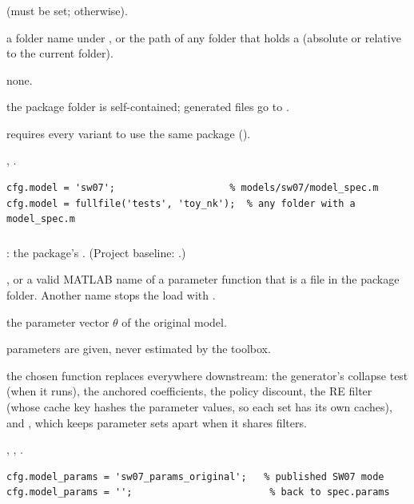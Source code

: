 \documentclass[11pt,a4paper]{article}
\DeclareRobustCommand{\codem}[1]{\texttt{\detokenize{#1}}}
\newenvironment{optspec}%
  {\begin{description}[style=sameline,leftmargin=2.7cm,labelwidth=2.5cm,font=\normalfont\itshape]}%
  {\end{description}}
\begin{document}
\subsubsection{\texorpdfstring{\codem{model}}{model}}\label{opt:model}
\begin{optspec}
  \item[Default]  (must be set;  otherwise).
  \item[Values] a folder name under , or the path of any folder that holds a
         (absolute or relative to the current folder).
  \item[Math] none.
  \item[Assumptions] the package folder is self-contained; generated files go to
        .
  \item[Interactions]  requires every variant to use the same package
        ().
  \item[Code] , .
  \item[Example]
\begin{lstlisting}
cfg.model = 'sw07';                    % models/sw07/model_spec.m
cfg.model = fullfile('tests', 'toy_nk');  % any folder with a model_spec.m
\end{lstlisting}
\end{optspec}

\subsubsection{\texorpdfstring{\codem{model_params}}{model\_params}}\label{opt:model-params}
\begin{optspec}
  \item[Default] : the package's . (Project baseline:
        .)
  \item[Values] , or a valid MATLAB name of a parameter function that is a
         file in the package folder. Another name stops the load with
        .
  \item[Math] the parameter vector $\theta$ of the original model.
  \item[Assumptions] parameters are given, never estimated by the toolbox.
  \item[Interactions] the chosen function replaces  everywhere downstream:
        the generator's collapse test (when it runs), the anchored coefficients, the policy
        discount, the RE
        filter (whose cache key hashes the parameter values, so each set has its own caches),
        and , which keeps parameter sets apart when it shares filters.
  \item[Code] , , .
  \item[Example]
\begin{lstlisting}
cfg.model_params = 'sw07_params_original';   % published SW07 mode
cfg.model_params = '';                        % back to spec.params
\end{lstlisting}
\end{optspec}
\end{document}
